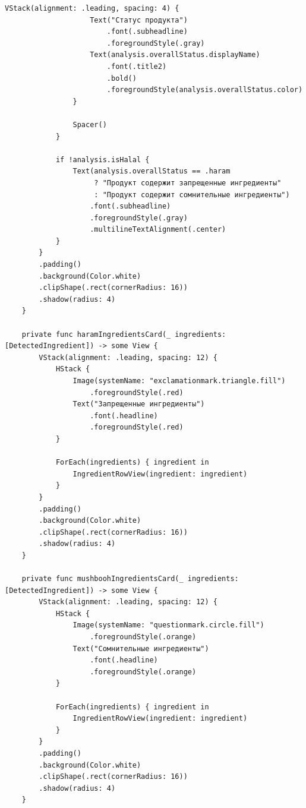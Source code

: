 \begin{lstlisting}[basicstyle=\tiny\ttfamily,breaklines=true]
                VStack(alignment: .leading, spacing: 4) {
                    Text("Статус продукта")
                        .font(.subheadline)
                        .foregroundStyle(.gray)
                    Text(analysis.overallStatus.displayName)
                        .font(.title2)
                        .bold()
                        .foregroundStyle(analysis.overallStatus.color)
                }
                
                Spacer()
            }
            
            if !analysis.isHalal {
                Text(analysis.overallStatus == .haram 
                     ? "Продукт содержит запрещенные ингредиенты"
                     : "Продукт содержит сомнительные ингредиенты")
                    .font(.subheadline)
                    .foregroundStyle(.gray)
                    .multilineTextAlignment(.center)
            }
        }
        .padding()
        .background(Color.white)
        .clipShape(.rect(cornerRadius: 16))
        .shadow(radius: 4)
    }
    
    private func haramIngredientsCard(_ ingredients: [DetectedIngredient]) -> some View {
        VStack(alignment: .leading, spacing: 12) {
            HStack {
                Image(systemName: "exclamationmark.triangle.fill")
                    .foregroundStyle(.red)
                Text("Запрещенные ингредиенты")
                    .font(.headline)
                    .foregroundStyle(.red)
            }
            
            ForEach(ingredients) { ingredient in
                IngredientRowView(ingredient: ingredient)
            }
        }
        .padding()
        .background(Color.white)
        .clipShape(.rect(cornerRadius: 16))
        .shadow(radius: 4)
    }
    
    private func mushboohIngredientsCard(_ ingredients: [DetectedIngredient]) -> some View {
        VStack(alignment: .leading, spacing: 12) {
            HStack {
                Image(systemName: "questionmark.circle.fill")
                    .foregroundStyle(.orange)
                Text("Сомнительные ингредиенты")
                    .font(.headline)
                    .foregroundStyle(.orange)
            }
            
            ForEach(ingredients) { ingredient in
                IngredientRowView(ingredient: ingredient)
            }
        }
        .padding()
        .background(Color.white)
        .clipShape(.rect(cornerRadius: 16))
        .shadow(radius: 4)
    }
    

\end{lstlisting}
